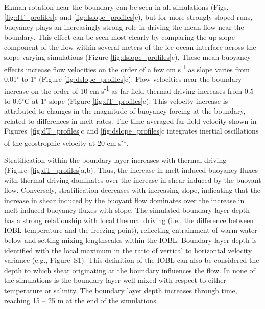 \documentclass[draft]{agujournal2019}
\begin{document}
Ekman rotation near the boundary can be seen in all simulations (Figs. \ref{fig:dT_profiles}c and \ref{fig:dslope_profiles}c), but for more strongly sloped runs, buoyancy plays an increasingly strong role in driving the mean flow near the boundary. This effect can be seen most clearly by comparing the up-slope component of the flow within several meters of the ice-ocean interface across the slope-varying simulations (Figure \ref{fig:dslope_profiles}c). These mean buoyancy effects increase flow velocities on the order of a few cm s\textsuperscript{-1} as slope varies from 0.01$^{\circ}$ to 1$^{\circ}$ (Figure \ref{fig:dslope_profiles}c). Flow velocities near the boundary increase on the order of 10 cm s\textsuperscript{-1} as far-field thermal driving increases from 0.5 to 0.6$^{\circ}$C at 1$^{\circ}$ slope (Figure \ref{fig:dT_profiles}c). This velocity increase is attributed to changes in the magnitude of buoyancy forcing at the boundary, related to differences in melt rates. The time-averaged far-field velocity shown in Figures~\ref{fig:dT_profiles}c and \ref{fig:dslope_profiles}c integrates inertial oscillations of the geostrophic velocity at 20 cm s\textsuperscript{-1}. 

Stratification within the boundary layer increases with thermal driving (Figure~\ref{fig:dT_profiles}a,b). Thus, the increase in melt-induced buoyancy fluxes with thermal driving dominates over the increase in shear induced by the buoyant flow. Conversely, stratification decreases with increasing slope, indicating that the increase in shear induced by the buoyant flow dominates over the increase in melt-induced buoyancy fluxes with slope. The simulated boundary layer depth has a strong relationship with local thermal driving (i.e., the difference between IOBL temperature and the freezing point), reflecting entrainment of warm water below and setting mixing lengthscales  within the IOBL. Boundary layer depth is identified with the local maximum in the ratio of vertical to horizontal velocity variance (e.g., Figure~S1). This definition of the IOBL can also be considered the depth to which shear originating at the boundary influences the flow. In none of the simulations is the boundary layer well-mixed with respect to either temperature or salinity. The boundary layer depth increases through time, reaching 15 -- 25 m at the end of the simulations. 
\end{document}
